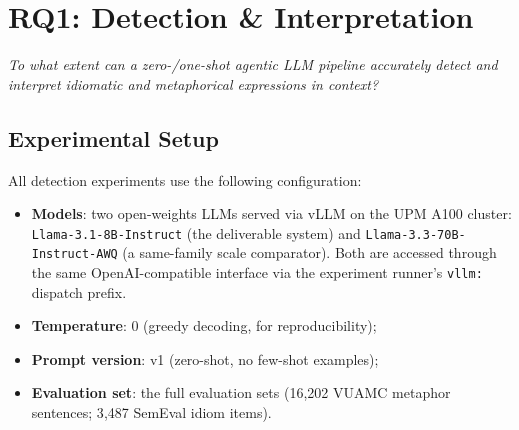 \section{RQ1: Detection \& Interpretation}
\label{sec:rq1}
\textit{To what extent can a zero-/one-shot agentic LLM pipeline accurately detect and interpret idiomatic and metaphorical expressions in context?}


\subsection{Experimental Setup}

All detection experiments use the following configuration:
\begin{itemize}
    \item \textbf{Models}: two open-weights LLMs served via vLLM on the UPM A100 cluster: \texttt{Llama-3.1-\allowbreak 8B-\allowbreak Instruct} (the deliverable system) and \texttt{Llama-3.3-\allowbreak 70B-\allowbreak Instruct-AWQ} (a same-family scale comparator). Both are accessed through the same OpenAI-compatible interface via the experiment runner's \texttt{vllm:} dispatch prefix.
    \item \textbf{Temperature}: 0 (greedy decoding, for reproducibility);
    \item \textbf{Prompt version}: v1 (zero-shot, no few-shot examples);
    \item \textbf{Evaluation set}: the full evaluation sets (16{,}202 VUAMC metaphor sentences; 3{,}487 SemEval idiom items).
\end{itemize}


